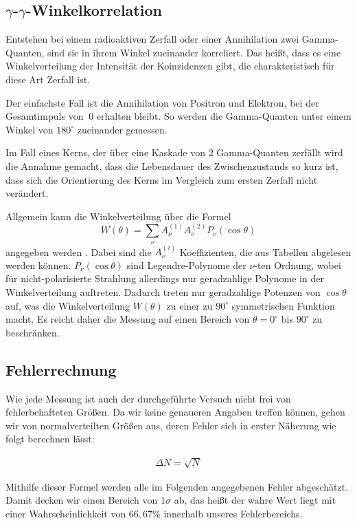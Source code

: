 \documentclass[11pt]{scrartcl}
\begin{document}
\subsection{$\gamma$-$\gamma$-Winkelkorrelation}
Entstehen bei einem radioaktiven Zerfall oder einer Annihilation zwei Gamma-Quanten, sind sie
in ihrem Winkel zueinander korreliert. Das heißt, dass es eine Winkelverteilung der Intensität
der Koinzidenzen gibt, die charakteristisch für diese Art Zerfall ist. 

Der einfachste Fall ist die Annihilation von Positron und Elektron, bei der Gesamtimpuls von $~0$ 
erhalten bleibt. So werden die Gamma-Quanten unter einem Winkel von $180^\circ$ zueinander gemessen.

Im Fall eines Kerns, der über eine Kaskade von 2 Gamma-Quanten zerfällt wird die Annahme gemacht, dass
die Lebensdauer des Zwischenzustands so kurz ist, dass sich die Orientierung des Kerns im Vergleich 
zum ersten Zerfall nicht verändert. 

Allgemein kann die Winkelverteilung über die Formel
\begin{equation}
 W(\theta)=\sum_\nu A_\nu^{(1)} A_\nu^{(2)} P_\nu ( \cos \theta)
\end{equation}
angegeben werden \cite{grundlagen}. Dabei sind die $A_\nu^{(i)}$ Koeffizienten, die aus Tabellen abgelesen werden können.
$P_\nu(\cos \theta)$ sind Legendre-Polynome der $\nu$-ten Ordnung, wobei für nicht-polarisierte Strahlung
allerdings nur geradzahlige Polynome in der Winkelverteilung auftreten. Dadurch treten nur geradzahlige
Potenzen von $\cos \theta$ auf, was die Winkelverteilung $W(\theta)$ zu einer zu $90^\circ$ symmetrischen
Funktion macht. Es reicht daher die Messung auf einen Bereich von $\theta=0^\circ$ bis $90^\circ$ zu 
beschränken.

\subsection{Fehlerrechnung}

Wie jede Messung ist auch der durchgeführte Versuch nicht frei von fehlerbehafteten Größen. Da wir keine genaueren Angaben treffen können, gehen wir von normalverteilten Größen aus, deren Fehler sich in erster Näherung wie folgt berechnen lässt:

\begin{align}
\Delta N = \sqrt{N}
\end{align}

Mithilfe dieser Formel werden alle im Folgenden angegebenen Fehler abgeschätzt. Damit decken wir einen Bereich von $1\sigma$ ab, das heißt der wahre Wert liegt mit einer Wahrscheinlichkeit von $66,67\%$ innerhalb unseres Fehlerbereichs. 
\end{document}
